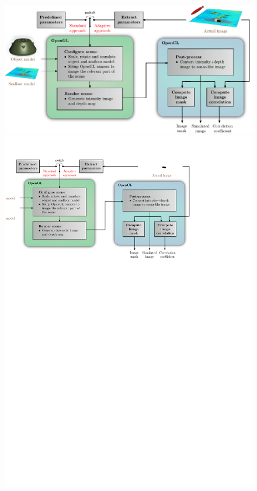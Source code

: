 \newcommand\figstep[2]{\tikz[baseline=(char.base)]{%
            \node[shape=circle,draw,color=Green,inner sep=0.5pt] (char) {#1};}\mbox{}\hfill\parbox[t]{.97\linewidth}{#2}} 
\begin{figure}[t]\centering%
\ifOverLeaf%
  \includegraphics[width=\linewidth]{gfx/simulator.pdf}%
\else
  \includegraphics[drawing,width=\linewidth]{gfx/simulator.svg}%

\end{figure}
